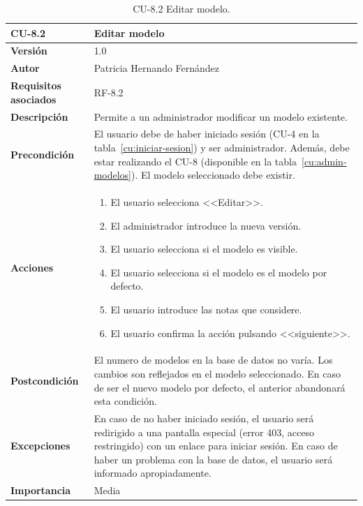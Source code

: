 \begin{table}[p]
	\centering
	\begin{tabularx}{\linewidth}{ p{} p{} }
		\toprule
		\textbf{CU-8.2}    & \textbf{Editar modelo}\\
		\toprule
		\textbf{Versión}              & 1.0    \\
		\textbf{Autor}                & Patricia Hernando Fernández \\
		\textbf{Requisitos asociados} & RF-8.2 \\
		\textbf{Descripción}          & Permite a un administrador modificar un modelo existente.\\
		\textbf{Precondición}         & El usuario debe de haber iniciado sesión (CU-4 en la tabla~\ref{cu:iniciar-sesion}) y ser administrador. Además, debe estar realizando el CU-8 (disponible en la tabla~\ref{cu:admin-modelos}). El modelo seleccionado debe existir. \\
		\textbf{Acciones}             &
		\begin{enumerate}
			\def\labelenumi{\arabic{enumi}.}
			\tightlist
			\item El usuario selecciona <<Editar>>.
			\item El administrador introduce la nueva versión.
			\item El usuario selecciona si el modelo es visible.
			\item El usuario selecciona si el modelo es el modelo por defecto.
			\item El usuario introduce las notas que considere.
			\item El usuario confirma la acción pulsando <<siguiente>>.
		\end{enumerate}\\
		\textbf{Postcondición}        & El numero de modelos en la base de datos no varía. Los cambios son reflejados en el modelo seleccionado. En caso de ser el nuevo modelo por defecto, el anterior abandonará esta condición. \\
		\textbf{Excepciones}          & En caso de no haber iniciado sesión, el usuario será redirigido a una pantalla especial (error 403, acceso restringido) con un enlace para iniciar sesión. En caso de haber un problema con la base de datos, el usuario será informado apropiadamente.\\
		\textbf{Importancia}          & Media \\
		\bottomrule
	\end{tabularx}
	\caption{CU-8.2 Editar modelo.}
	\label{cu:editar-modelo}
\end{table}


